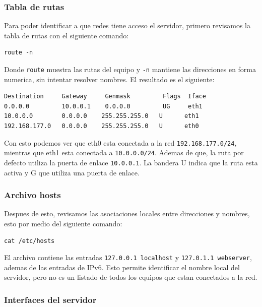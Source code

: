 \documentclass[letterpaper,11pt]{article}
\begin{document}
\subsubsection{Tabla de rutas}

Para poder identificar a que redes tiene acceso el servidor,
primero revisamos la tabla de rutas con el siguiente comando:

\begin{lstlisting}[style=consolaSeguridad]
route -n
\end{lstlisting}

Donde \texttt{route} muestra las rutas del equipo y \texttt{-n}
mantiene las direcciones en forma numerica, sin intentar resolver
nombres. El resultado es el siguiente:

\begin{lstlisting}[style=output]
Destination     Gateway     Genmask         Flags  Iface
0.0.0.0         10.0.0.1    0.0.0.0         UG     eth1
10.0.0.0        0.0.0.0    255.255.255.0   U      eth1
192.168.177.0   0.0.0.0    255.255.255.0   U      eth0
\end{lstlisting}

Con esto podemos ver que eth0 esta conectada a la red
\texttt{192.168.177.0/24}, mientras que eth1 esta conectada a
\texttt{10.0.0.0/24}. Ademas de que, la ruta por defecto utiliza la puerta de
enlace \texttt{10.0.0.1}. La bandera U indica que la ruta esta
activa y G que utiliza una puerta de enlace.

\subsubsection{Archivo hosts}

Despues de esto, revisamos las asociaciones locales entre
direcciones y nombres, esto por medio del siguiente comando:

\begin{lstlisting}[style=consolaSeguridad]
cat /etc/hosts
\end{lstlisting}

El archivo contiene las entradas \texttt{127.0.0.1 localhost} y
\texttt{127.0.1.1 webserver}, ademas de las entradas de IPv6. Esto
permite identificar el nombre local del servidor, pero no es un
listado de todos los equipos que estan conectados a la red.

\subsubsection{Interfaces del servidor}
\end{document}
